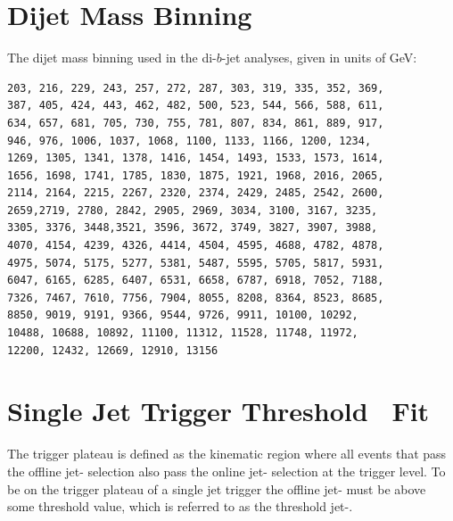
\appendix

\clearpage
{}
{}

\chapter{Dijet Mass Binning}
\label{app:dijet_bins}

\noindent
The dijet mass binning used in the di-$b$-jet analyses, given in units of GeV:
\begin{verbatim}
203, 216, 229, 243, 257, 272, 287, 303, 319, 335, 352, 369,
387, 405, 424, 443, 462, 482, 500, 523, 544, 566, 588, 611, 
634, 657, 681, 705, 730, 755, 781, 807, 834, 861, 889, 917,
946, 976, 1006, 1037, 1068, 1100, 1133, 1166, 1200, 1234, 
1269, 1305, 1341, 1378, 1416, 1454, 1493, 1533, 1573, 1614,
1656, 1698, 1741, 1785, 1830, 1875, 1921, 1968, 2016, 2065, 
2114, 2164, 2215, 2267, 2320, 2374, 2429, 2485, 2542, 2600, 
2659,2719, 2780, 2842, 2905, 2969, 3034, 3100, 3167, 3235, 
3305, 3376, 3448,3521, 3596, 3672, 3749, 3827, 3907, 3988, 
4070, 4154, 4239, 4326, 4414, 4504, 4595, 4688, 4782, 4878, 
4975, 5074, 5175, 5277, 5381, 5487, 5595, 5705, 5817, 5931, 
6047, 6165, 6285, 6407, 6531, 6658, 6787, 6918, 7052, 7188, 
7326, 7467, 7610, 7756, 7904, 8055, 8208, 8364, 8523, 8685, 
8850, 9019, 9191, 9366, 9544, 9726, 9911, 10100, 10292, 
10488, 10688, 10892, 11100, 11312, 11528, 11748, 11972, 
12200, 12432, 12669, 12910, 13156
\end{verbatim}


\chapter{Single Jet Trigger Threshold~\pT{} Fit}
\label{app:triggerTurnOn_fit}

The trigger plateau is defined as the kinematic region where all events that pass the offline jet-\pT{} selection
also pass the online jet-\pT{} selection at the trigger level.
To be on the trigger plateau of a single jet trigger
the offline jet-\pT{} must be above some threshold value,
which is referred to as the threshold jet-\pT{}.

